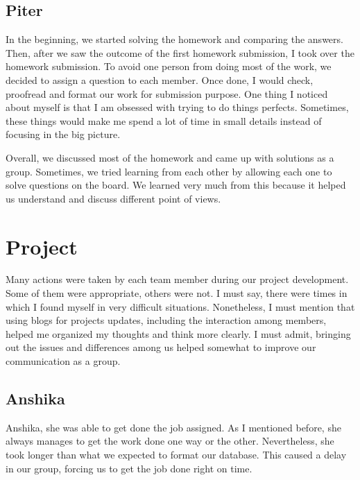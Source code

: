 \documentclass{sig-alternate}
\begin{document}
	\subsection{Piter}\normalfont \normalsize{
		In the beginning, we started solving the homework and comparing the answers. Then, after we saw the outcome of the first homework submission, I took over the homework submission. To avoid one person from doing most of the work, we decided to assign a question to each member. Once done, I would check, proofread and format our work for submission purpose. One thing I noticed about myself is that I am obsessed with trying to do things perfects. Sometimes, these things would make me spend a lot of time in small details instead of focusing in the big picture. \newline}
		
		\normalfont \normalsize{Overall, we discussed most of the homework and came up with solutions as a group. Sometimes, we tried learning from each other by allowing each one to solve questions on the board. We learned very much from this because it helped us understand and discuss different point of views.\newline}
		

\section{Project}
\label{project}\normalfont \normalsize{
	Many actions were taken by each team member during our project development. Some of them were appropriate, others were not. I must say, there were times in which I found myself in very difficult situations. Nonetheless, I must mention that using blogs for projects updates, including the interaction among members, helped me organized my thoughts and think more clearly. I must admit, bringing out the issues and differences among us helped somewhat to improve our communication as a group.\newline}

	\subsection{Anshika}\normalfont \normalsize{
		Anshika, she was able to get done the job assigned. As I mentioned before, she always manages to get the work done one way or the other. Nevertheless, she took longer than what we expected to format our database. This caused a delay in our group, forcing us to get the job done right on time.\newline }
\end{document}
